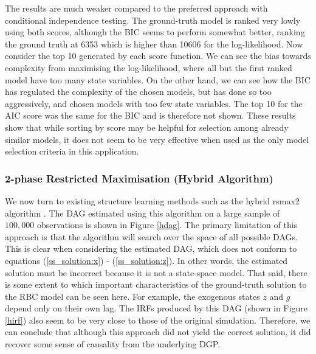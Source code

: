 \documentclass{article}
\begin{document}
The results are much weaker compared to the preferred approach with conditional independence testing. The ground-truth model is ranked very lowly using both scores, although the BIC seems to perform somewhat better, ranking the ground truth at 6353 which is higher than 10606 for the log-likelihood. Now consider the top 10 generated by each score function. We can see the bias towards complexity from maximising the log-likelihood, where all but the first ranked model have too many state variables. On the other hand, we can see how the BIC has regulated the complexity of the chosen models, but has done so too aggressively, and chosen models with too few state variables. The top 10 for the AIC score was the same for the BIC and is therefore not shown. These results show that while sorting by score may be helpful for selection among already similar models, it does not seem to be very effective when used as the only model selection criteria in this application.

\subsubsection{2-phase Restricted Maximisation (Hybrid Algorithm)} \label{rsmax2}

We now turn to existing structure learning methods such as the hybrid rsmax2 algorithm \parencite{scutari2014multiple}. The DAG estimated using this algorithm on a large sample of $100,000$ observations is shown in Figure \ref{hdag}. The primary limitation of this approach is that the algorithm will search over the space of all possible DAGs. This is clear when considering the estimated DAG, which does not conform to equations (\ref{ss_solution:x}) - (\ref{ss_solution:z}). In other words, the estimated solution must be incorrect because it is not a state-space model. That said, there is some extent to which important characteristics of the ground-truth solution to the RBC model can be seen here. For example, the exogenous states $z$ and $g$ depend only on their own lag. The IRFs produced by this DAG (shown in Figure \ref{hirf}) also seem to be very close to those of the original simulation. Therefore, we can conclude that although this approach did not yield the correct solution, it did recover some sense of causality from the underlying DGP.
\end{document}
